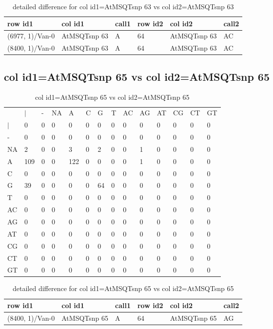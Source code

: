 \begin{center}
\begin{longtable}{|l|l|l|l|l|l|}
\caption{detailed difference for col id1=AtMSQTsnp 63 vs col id2=AtMSQTsnp 63} \label{table_dm957}\\
\hline
row id1&col id1&call1&row id2&col id2&call2\\
\hline
(6977, 1)/Van-0&AtMSQTsnp 63&A&64&AtMSQTsnp 63&AC\\
(8400, 1)/Van-0&AtMSQTsnp 63&A&64&AtMSQTsnp 63&AC\\
\hline
\end{longtable}
\end{center}

\subsection{col id1=AtMSQTsnp 65 vs col id2=AtMSQTsnp 65}
\begin{center}
\begin{longtable}{|l|l|l|l|l|l|l|l|l|l|l|l|l|l|}
\caption{col id1=AtMSQTsnp 65 vs col id2=AtMSQTsnp 65} \label{table_dm958}\\
\hline
\\
\hline
&$|$&-&NA&A&C&G&T&AC&AG&AT&CG&CT&GT\\
$|$&0&0&0&0&0&0&0&0&0&0&0&0&0\\
-&0&0&0&0&0&0&0&0&0&0&0&0&0\\
NA&2&0&0&3&0&2&0&0&1&0&0&0&0\\
A&109&0&0&122&0&0&0&0&1&0&0&0&0\\
C&0&0&0&0&0&0&0&0&0&0&0&0&0\\
G&39&0&0&0&0&64&0&0&0&0&0&0&0\\
T&0&0&0&0&0&0&0&0&0&0&0&0&0\\
AC&0&0&0&0&0&0&0&0&0&0&0&0&0\\
AG&0&0&0&0&0&0&0&0&0&0&0&0&0\\
AT&0&0&0&0&0&0&0&0&0&0&0&0&0\\
CG&0&0&0&0&0&0&0&0&0&0&0&0&0\\
CT&0&0&0&0&0&0&0&0&0&0&0&0&0\\
GT&0&0&0&0&0&0&0&0&0&0&0&0&0\\
\hline
\end{longtable}
\end{center}

\begin{center}
\begin{longtable}{|l|l|l|l|l|l|}
\caption{detailed difference for col id1=AtMSQTsnp 65 vs col id2=AtMSQTsnp 65} \label{table_dm959}\\
\hline
row id1&col id1&call1&row id2&col id2&call2\\
\hline
(8400, 1)/Van-0&AtMSQTsnp 65&A&64&AtMSQTsnp 65&AG\\
\hline
\end{longtable}
\end{center}

